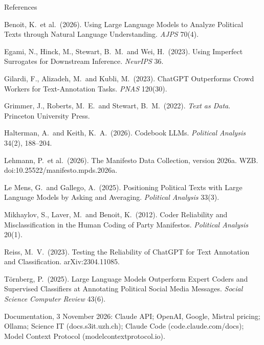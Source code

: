 \documentclass[svgnames,x11names,dvipsnames]{beamer}
\begin{document}
\begin{frame}{References}
{\scriptsize
Benoit, K.\ et al.\ (2026). Using Large Language Models to Analyze Political Texts through Natural Language Understanding. \textit{AJPS} 70(4).

Egami, N., Hinck, M., Stewart, B.\ M.\ and Wei, H.\ (2023). Using Imperfect Surrogates for Downstream Inference. \textit{NeurIPS} 36.

Gilardi, F., Alizadeh, M.\ and Kubli, M.\ (2023). ChatGPT Outperforms Crowd Workers for Text-Annotation Tasks. \textit{PNAS} 120(30).

Grimmer, J., Roberts, M.\ E.\ and Stewart, B.\ M.\ (2022). \textit{Text as Data}. Princeton University Press.

Halterman, A.\ and Keith, K.\ A.\ (2026). Codebook LLMs. \textit{Political Analysis} 34(2), 188--204.

Lehmann, P.\ et al.\ (2026). The Manifesto Data Collection, version 2026a. WZB. doi:10.25522/manifesto.mpds.2026a.

Le Mens, G.\ and Gallego, A.\ (2025). Positioning Political Texts with Large Language Models by Asking and Averaging. \textit{Political Analysis} 33(3).

Mikhaylov, S., Laver, M.\ and Benoit, K.\ (2012). Coder Reliability and Misclassification in the Human Coding of Party Manifestos. \textit{Political Analysis} 20(1).

Reiss, M.\ V.\ (2023). Testing the Reliability of ChatGPT for Text Annotation and Classification. arXiv:2304.11085.

T\"ornberg, P.\ (2025). Large Language Models Outperform Expert Coders and Supervised Classifiers at Annotating Political Social Media Messages. \textit{Social Science Computer Review} 43(6).

\vspace{0.2cm}
Documentation, 3 November 2026: Claude API; OpenAI, Google, Mistral pricing; Ollama; Science IT (docs.s3it.uzh.ch); Claude Code (code.claude.com/docs); Model Context Protocol (modelcontextprotocol.io).
}
\end{frame}
\end{document}
